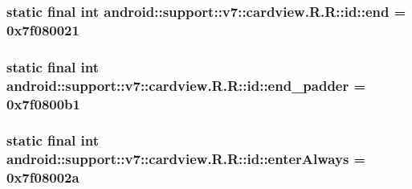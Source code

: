 \hypertarget{classandroid_1_1support_1_1v7_1_1cardview_1_1_r_1_1id_8d54ce3a2cb5c1544fe9211573eb0b13}{
\subsubsection[{end}]{\setlength{\rightskip}{0pt plus 5cm}static final int android::support::v7::cardview.R.R::id::end = 0x7f080021}}
\label{classandroid_1_1support_1_1v7_1_1cardview_1_1_r_1_1id_8d54ce3a2cb5c1544fe9211573eb0b13}


\hypertarget{classandroid_1_1support_1_1v7_1_1cardview_1_1_r_1_1id_e989a771cf170180994d96b4802e77b1}{
\subsubsection[{end\_\-padder}]{\setlength{\rightskip}{0pt plus 5cm}static final int android::support::v7::cardview.R.R::id::end\_\-padder = 0x7f0800b1}}
\label{classandroid_1_1support_1_1v7_1_1cardview_1_1_r_1_1id_e989a771cf170180994d96b4802e77b1}


\hypertarget{classandroid_1_1support_1_1v7_1_1cardview_1_1_r_1_1id_33c611fe1f513908de2121fc18790be2}{
\subsubsection[{enterAlways}]{\setlength{\rightskip}{0pt plus 5cm}static final int android::support::v7::cardview.R.R::id::enterAlways = 0x7f08002a}}
\label{classandroid_1_1support_1_1v7_1_1cardview_1_1_r_1_1id_33c611fe1f513908de2121fc18790be2}


